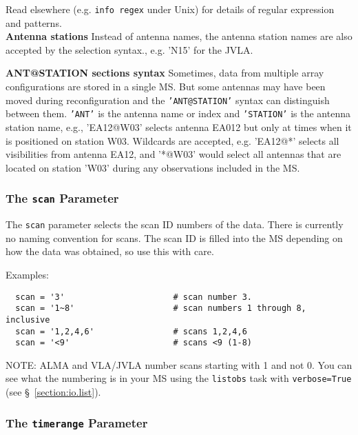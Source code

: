 Read elsewhere (e.g. {\tt info regex} under Unix) for details of
regular expression and patterns.\\

{\bf Antenna stations}
Instead of antenna names, the antenna station names are also accepted
by the selection syntax., e.g. 'N15' for the JVLA.


{\bf ANT@STATION sections syntax}
Sometimes, data from multiple array configurations are stored in a
single MS. But some antennas may have been moved during reconfiguration
and the {\tt 'ANT@STATION'} syntax can distinguish between them. {\tt 'ANT'}
is the antenna name or index and {\tt 'STATION'} is the antenna station
name, e.g., 'EA12@W03' selects antenna EA012 but only at times when it is
positioned on station W03. Wildcards are accepted, e.g. 'EA12@*'
selects all visibilities from antenna EA12, and '*@W03' would select
all antennas that are located on station 'W03' during any
observations included in the MS. 


\subsubsection{The {\tt scan} Parameter}
\label{section:io.selection.selectdata.scan}

The {\tt scan} parameter selects the scan ID numbers of the data.
There is currently no naming convention for scans.  The scan ID
is filled into the MS depending on how the data was obtained,
so use this with care.

Examples:
\small
\begin{verbatim}
  scan = '3'                      # scan number 3.
  scan = '1~8'                    # scan numbers 1 through 8, inclusive
  scan = '1,2,4,6'                # scans 1,2,4,6
  scan = '<9'                     # scans <9 (1-8)
\end{verbatim}
\normalsize

NOTE: ALMA and VLA/JVLA number scans starting with 1
and not 0.  You can see what the numbering is in your MS using
the {\tt listobs} task with {\tt verbose=True} (see
\S~\ref{section:io.list}).

\subsubsection{The {\tt timerange} Parameter}
\label{section:io.selection.selectdata.timerange}

